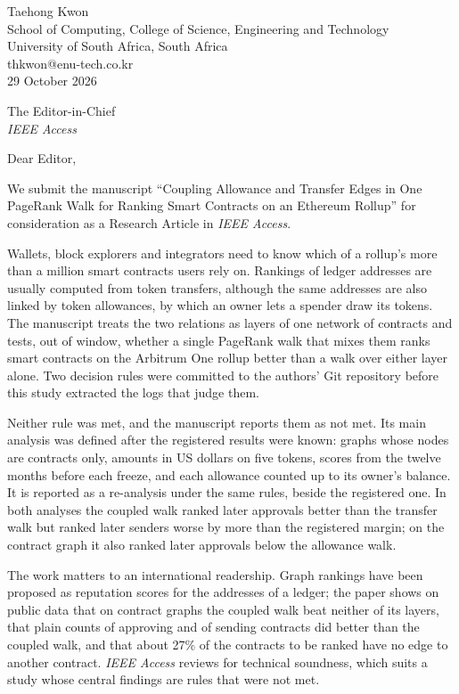 \documentclass[11pt]{article}
\begin{document}
\begin{flushright}
Taehong Kwon\\
School of Computing, College of Science, Engineering and Technology\\
University of South Africa, South Africa\\
thkwon@enu-tech.co.kr\\[0.3em]
29 October 2026
\end{flushright}

The Editor-in-Chief\\
\emph{IEEE Access}

Dear Editor,

We submit the manuscript ``Coupling Allowance and Transfer Edges in One PageRank Walk for Ranking Smart Contracts on an Ethereum Rollup'' for consideration as a Research Article in \emph{IEEE Access}.

Wallets, block explorers and integrators need to know which of a rollup's more than a million smart contracts users rely on. Rankings of ledger addresses are usually computed from token transfers, although the same addresses are also linked by token allowances, by which an owner lets a spender draw its tokens. The manuscript treats the two relations as layers of one network of contracts and tests, out of window, whether a single PageRank walk that mixes them ranks smart contracts on the Arbitrum One rollup better than a walk over either layer alone. Two decision rules were committed to the authors' Git repository before this study extracted the logs that judge them.

Neither rule was met, and the manuscript reports them as not met. Its main analysis was defined after the registered results were known: graphs whose nodes are contracts only, amounts in US dollars on five tokens, scores from the twelve months before each freeze, and each allowance counted up to its owner's balance. It is reported as a re-analysis under the same rules, beside the registered one. In both analyses the coupled walk ranked later approvals better than the transfer walk but ranked later senders worse by more than the registered margin; on the contract graph it also ranked later approvals below the allowance walk.

The work matters to an international readership. Graph rankings have been proposed as reputation scores for the addresses of a ledger; the paper shows on public data that on contract graphs the coupled walk beat neither of its layers, that plain counts of approving and of sending contracts did better than the coupled walk, and that about 27\% of the contracts to be ranked have no edge to another contract. \emph{IEEE Access} reviews for technical soundness, which suits a study whose central findings are rules that were not met.
\end{document}
